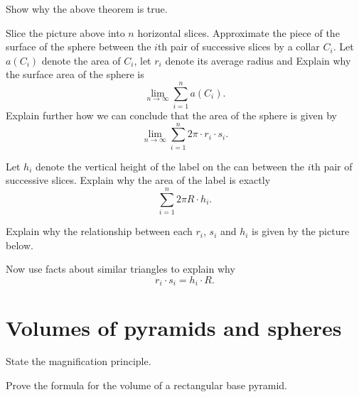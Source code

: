 \documentclass[newpage,hints,handout]{ximera}
\begin{document}
\begin{problem}
Show why the above theorem is true.

\begin{hint}
Slice the picture above into $n$ horizontal slices. Approximate the
piece of the surface of the sphere between the $i$th pair of
successive slices by a collar $C_{i}$. Let $a\left( C_{i}\right) $
denote the area of $C_{i}$, let $r_{i}$ denote its average radius and
Explain why the surface area of the sphere is
\[
\lim_{n\to \infty}\sum_{i=1}^{n} a(C_i).
\]
Explain further how we can conclude that the area of the sphere is
given by
\[%
\lim_{n\to \infty}\sum_{i=1}^{n} 2\pi\cdot r_{i}\cdot s_{i}.
\]

\end{hint}
\begin{hint}
Let $h_{i}$ denote the vertical height of the label on the can between
the $i$th pair of successive slices. Explain why the area of the label is exactly%
\[%
\sum_{i=1}^{n} 2\pi R \cdot h_{i}.
\]
\end{hint}
\begin{hint}
Explain why the relationship between each $r_{i}$, $s_{i}$ and $h_{i}$
is given by the picture below.
\begin{image}
\end{image}
Now use facts about similar triangles to explain why
\[
r_{i}\cdot s_{i}=h_{i}\cdot R.
\]
\end{hint}
\end{problem}




\section{Volumes of pyramids and spheres}
\begin{listOutcomes}
\item State the magnification principle.
 \item Prove the formula for the volume of a rectangular base pyramid.
\end{listOutcomes}
\end{document}

